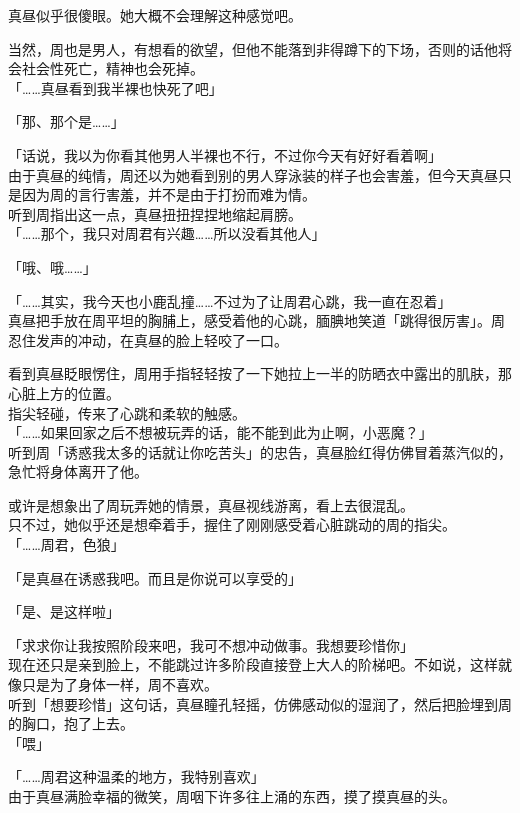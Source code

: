 真昼似乎很傻眼。她大概不会理解这种感觉吧。

当然，周也是男人，有想看的欲望，但他不能落到非得蹲下的下场，否则的话他将会社会性死亡，精神也会死掉。\\

「……真昼看到我半裸也快死了吧」

「那、那个是……」

「话说，我以为你看其他男人半裸也不行，不过你今天有好好看着啊」\\

由于真昼的纯情，周还以为她看到别的男人穿泳装的样子也会害羞，但今天真昼只是因为周的言行害羞，并不是由于打扮而难为情。\\

听到周指出这一点，真昼扭扭捏捏地缩起肩膀。\\

「……那个，我只对周君有兴趣……所以没看其他人」

「哦、哦……」

「……其实，我今天也小鹿乱撞……不过为了让周君心跳，我一直在忍着」\\

真昼把手放在周平坦的胸脯上，感受着他的心跳，腼腆地笑道「跳得很厉害」。周忍住发声的冲动，在真昼的脸上轻咬了一口。

看到真昼眨眼愣住，周用手指轻轻按了一下她拉上一半的防晒衣中露出的肌肤，那心脏上方的位置。\\

指尖轻碰，传来了心跳和柔软的触感。\\

「……如果回家之后不想被玩弄的话，能不能到此为止啊，小恶魔？」\\

听到周「诱惑我太多的话就让你吃苦头」的忠告，真昼脸红得仿佛冒着蒸汽似的，急忙将身体离开了他。

或许是想象出了周玩弄她的情景，真昼视线游离，看上去很混乱。\\

只不过，她似乎还是想牵着手，握住了刚刚感受着心脏跳动的周的指尖。\\

「……周君，色狼」

「是真昼在诱惑我吧。而且是你说可以享受的」

「是、是这样啦」

「求求你让我按照阶段来吧，我可不想冲动做事。我想要珍惜你」\\

现在还只是亲到脸上，不能跳过许多阶段直接登上大人的阶梯吧。不如说，这样就像只是为了身体一样，周不喜欢。\\

听到「想要珍惜」这句话，真昼瞳孔轻摇，仿佛感动似的湿润了，然后把脸埋到周的胸口，抱了上去。\\

「喂」

「……周君这种温柔的地方，我特别喜欢」\\

由于真昼满脸幸福的微笑，周咽下许多往上涌的东西，摸了摸真昼的头。
